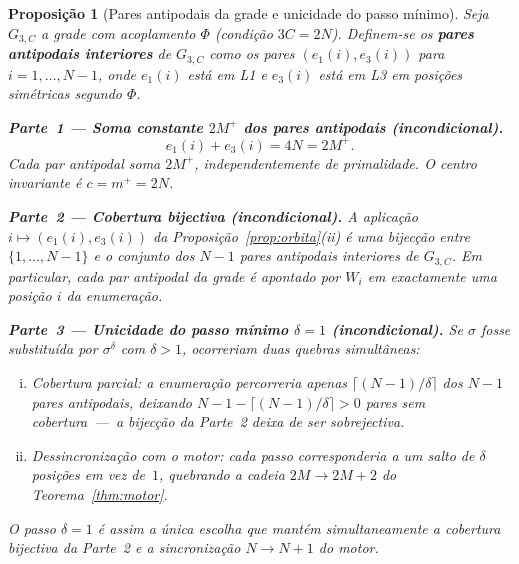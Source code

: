 \documentclass[12pt, a4paper]{article}
\theoremstyle{plain}
\newtheorem{proposition}[theorem]{Proposição}
\theoremstyle{definition}
\theoremstyle{remark}
\begin{document}
	\begin{proposition}[Pares antipodais da grade e unicidade do passo mínimo]
		\label{prop:pares-diagonais}
		Seja $G_{3,C}$ a grade com acoplamento $\Phi$ (condição $3C=2N$).
		Definem-se os \textbf{pares antipodais interiores} de $G_{3,C}$
		como os pares $(e_1(i), e_3(i))$ para $i=1,\ldots,N-1$, onde
		$e_1(i)$ está em L1 e $e_3(i)$ está em L3 em posições
		simétricas segundo $\Phi$.
		
		\medskip
		\noindent\textbf{Parte~1 --- Soma constante $2M^+$ dos pares antipodais
			(incondicional).}
		\[
		e_1(i)+e_3(i) = 4N = 2M^+.
		\]
		Cada par antipodal soma $2M^+$, independentemente de primalidade.
		O centro invariante é $c = m^+ = 2N$.
		
		\medskip
		\noindent\textbf{Parte~2 --- Cobertura bijectiva (incondicional).}
		A aplicação $i\mapsto(e_1(i),e_3(i))$ da
		Proposição~\ref{prop:orbita}(ii) é uma bijecção entre
		$\{1,\ldots,N-1\}$ e o conjunto dos $N-1$ pares antipodais
		interiores de $G_{3,C}$.  Em particular, cada par antipodal
		da grade é \emph{apontado} por $W_i$ em exactamente uma posição
		$i$ da enumeração.
		
		\medskip
		\noindent\textbf{Parte~3 --- Unicidade do passo mínimo $\delta=1$
			(incondicional).}
		Se $\sigma$ fosse substituída por $\sigma^\delta$ com $\delta>1$,
		ocorreriam duas quebras simultâneas:
		\begin{enumerate}[(i)]
			\item \emph{Cobertura parcial}: a enumeração percorreria apenas
			$\lceil(N-1)/\delta\rceil$ dos $N-1$ pares antipodais,
			deixando $N-1-\lceil(N-1)/\delta\rceil>0$ pares sem
			cobertura~---~a bijecção da Parte~2 deixa de ser sobrejectiva.
			\item \emph{Dessincronização com o motor}: cada passo
			corresponderia a um salto de $\delta$ posições em vez
			de~$1$, quebrando a cadeia
			$2M\to2M{+}2$ do Teorema~\ref{thm:motor}.
		\end{enumerate}
		O passo $\delta=1$ é assim a \emph{única} escolha que mantém
		simultaneamente a cobertura bijectiva da Parte~2 e a
		sincronização $N\to N{+}1$ do motor.
	\end{proposition}
	
\end{document}
